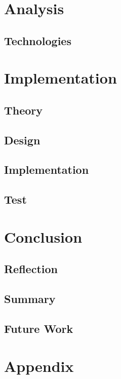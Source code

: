 




 
\tableofcontents



\part{Analysis}





\chapter{Technologies}


\part{Implementation}

\chapter{Theory}

\chapter{Design}

\chapter{Implementation}

\chapter{Test}


\part{Conclusion}

\chapter{Reflection}


\chapter{Summary}


\chapter{Future Work}


\printbibliography

\part{Appendix}
\appendix


 
